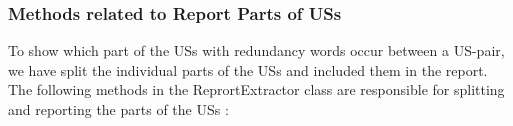\subsubsection*{Methods related to Report Parts of USs}
To show which part of the USs with redundancy words occur between a US-pair, we have split the individual parts of the USs and included them in the report.
The following methods in the ReprortExtractor class are responsible for splitting and reporting the parts of the USs :
